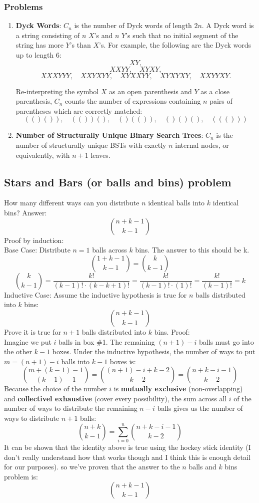 \documentclass[12pt]{article}
\begin{document}
\subsubsection{Problems}
\begin{enumerate}
\item \textbf{Dyck Words}: 
    \(C_n\) is the number of Dyck words of length \(2n\). A Dyck word is a string consisting of \(n\) \(X\)'s and \(n\) \(Y\)'s such that no initial segment of the string has more \(Y\)'s than \(X\)'s. For example, the following are the Dyck words up to length 6:
    \[
    XY,
    \]
    \[
    XXYY, \quad XYXY,
    \]
    \[
    XXXYYY, \quad XXYXYY, \quad XYXXYY, \quad XYXYXY, \quad XXYYXY.
    \]

    Re-interpreting the symbol \(X\) as an open parenthesis and \(Y\) as a close parenthesis, \(C_n\) counts the number of expressions containing \(n\) pairs of parentheses which are correctly matched:
    \[
    (()()), \quad (())(), \quad ()(()), \quad ()()(), \quad ((()))
    \]

\item \textbf{Number of Structurally Unique Binary Search Trees}: \(C_n\) is the number of structurally unique BSTs with exactly \(n\) internal nodes, or equivalently, with \(n+1\) leaves. 
\end{enumerate}

\subsection{Stars and Bars (or balls and bins) problem}
How many different ways can you distribute \(n\) identical balls into \(k\) identical bins? Answer: 
\[\binom{n+k-1}{k-1}\]
Proof by induction:\\

Base Case: Distribute \(n=1\) balls across \(k\) bins. The answer to  this should be k.\\

\[\binom{1+k-1}{k-1} = \binom{k}{k-1}\]
\[\binom{k}{k-1} = \frac{k!}{(k-1)! \cdot (k - k + 1)!} = \frac{k!}{(k-1)! \cdot (1)!} = \frac{k!}{(k-1)!} = k \]
Inductive Case: Assume the inductive hypothesis is true for \(n\) balls distributed into \(k\) bins:
\[\binom{n+k-1}{k-1}\]
Prove it is true for \(n+1\) balls distributed into \(k\) bins. Proof:\\

Imagine we put \(i\) balls in box \#1. The remaining \((n+1)-i\) balls must go into the other \(k-1\) boxes. Under the inductive hypothesis, the number of ways to put \(m = (n+1)-i\) balls into \(k-1\) boxes is:
\[\binom{m+(k-1) - 1}{(k-1)-1} = \binom{(n+1)-i+k - 2}{k-2} =  \binom{n+k - i - 1}{k-2}\]
Because the choice of the number \(i\) is \textbf{mutually exclusive} (non-overlapping) and \textbf{collectivel exhaustive} (cover every possibility), the sum across all \(i\) of the number of ways to distribute the remaining \(n-i\) balls gives us the number of ways to distribute \(n+1\) balls:
\[\binom{n+k}{k-1}  = \sum_{i=0}^n \binom{n+k - i - 1}{k-2}\]
It can be shown that the identity above is true using the hockey stick identity (I don't really understand how that works though and I think this is enough detail for our purposes). so we've proven that the answer to the \(n\) balls and \(k\) bins problem is:
\[\binom{n+k-1}{k-1}\]
\end{document}

